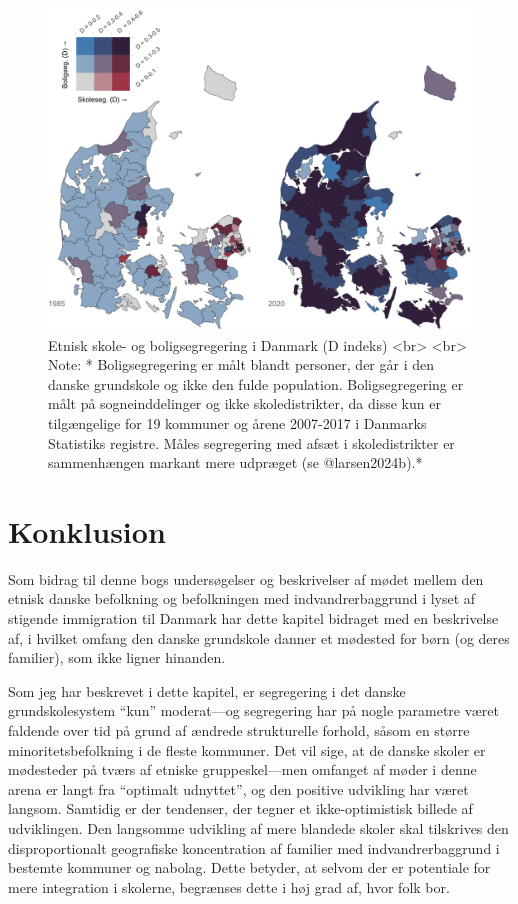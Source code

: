 \documentclass[
]{book}
\begin{document}
\begin{figure}
\includegraphics[width=1\linewidth]{images/Figur5} \caption{Etnisk skole- og boligsegregering i Danmark (D indeks) <br> <br> Note: * Boligsegregering er målt blandt personer, der går i den danske grundskole og ikke den fulde population. Boligsegregering er målt på sogneinddelinger og ikke skoledistrikter, da disse kun er tilgængelige for 19 kommuner og årene 2007-2017 i Danmarks Statistiks registre. Måles segregering med afsæt i skoledistrikter er sammenhængen markant mere udpræget (se @larsen2024b).*}\label{fig:fig-3-4}
\end{figure}

\section{Konklusion}\label{konklusion}

Som bidrag til denne bogs undersøgelser og beskrivelser af mødet mellem den etnisk danske befolkning og befolkningen med indvandrerbaggrund i lyset af stigende immigration til Danmark har dette kapitel bidraget med en beskrivelse af, i hvilket omfang den danske grundskole danner et mødested for børn (og deres familier), som ikke ligner hinanden.

Som jeg har beskrevet i dette kapitel, er segregering i det danske grundskolesystem ``kun'' moderat---og segregering har på nogle parametre været faldende over tid på grund af ændrede strukturelle forhold, såsom en større minoritetsbefolkning i de fleste kommuner. Det vil sige, at de danske skoler er mødesteder på tværs af etniske gruppeskel---men omfanget af møder i denne arena er langt fra ``optimalt udnyttet'', og den positive udvikling har været langsom. Samtidig er der tendenser, der tegner et ikke-optimistisk billede af udviklingen. Den langsomme udvikling af mere blandede skoler skal tilskrives den disproportionalt geografiske koncentration af familier med indvandrerbaggrund i bestemte kommuner og nabolag. Dette betyder, at selvom der er potentiale for mere integration i skolerne, begrænses dette i høj grad af, hvor folk bor.
\end{document}
